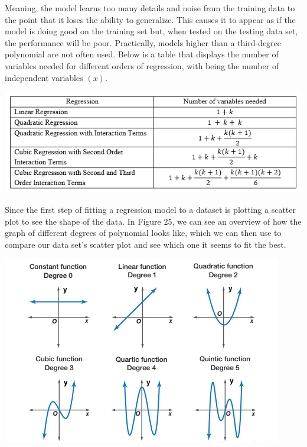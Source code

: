 \documentclass[a4paper,12pt]{report}
\begin{document}
Meaning, the model learns too many details and noise from the training data to the point that it loses the ability to generalize. This causes it to appear as if the model is doing good on the training set but, when tested on the testing data set, the performance will be poor. Practically, models higher than a third-degree polynomial are not often used. Below is a table that displays the number of variables needed for different orders of regression, with  being the number of independent variables $(x)$.

\begin{center}
    \captionsetup{type=figure}
    \includegraphics[width=.9\linewidth]{media/regressionformulasvars.png}
\end{center}

Since the first step of fitting a regression model to a dataset is plotting a scatter plot to see the shape of the data. In Figure 25, we can see an overview of how the graph of different degrees of polynomial looks like, which we can then use to compare our data set’s scatter plot and see which one it seems to fit the best. 

\begin{center}
    \captionsetup{type=figure}
    \includegraphics[width=.9\linewidth]{media/functiondegrees.png}
\end{center}
\end{document}
